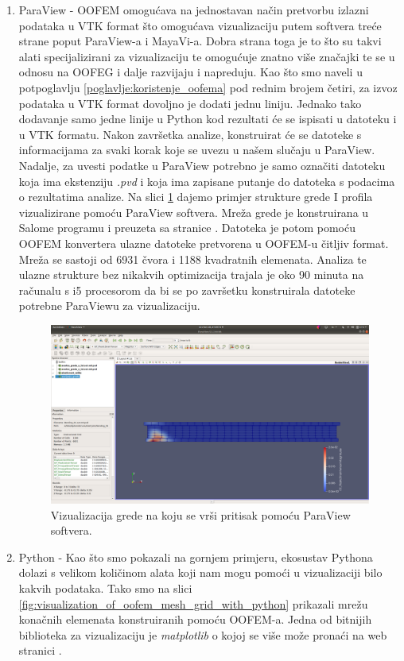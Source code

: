 \documentclass[a4paper,twoside,12pt]{memoir} %
\begin{document}
\begin{enumerate}
    \item ParaView - OOFEM omogućava na jednostavan način pretvorbu izlazni podataka u VTK format što omogućava vizualizaciju putem softvera treće strane poput ParaView-a i MayaVi-a. Dobra strana toga je to što su takvi alati specijalizirani za vizualizaciju te omogućuje znatno više značajki te se u odnosu na OOFEG i dalje razvijaju i napreduju. Kao što smo naveli u potpoglavlju \ref{poglavlje:koristenje_oofema} pod rednim brojem četiri, za izvoz podataka u VTK format dovoljno je dodati jednu liniju. Jednako tako dodavanje samo jedne linije u Python kod rezultati će se ispisati u datoteku i u VTK formatu. Nakon završetka analize, konstruirat će se datoteke s informacijama za svaki korak koje se uvezu u našem slučaju u ParaView. Nadalje, za uvesti podatke u ParaView potrebno je samo označiti datoteku koja ima ekstenziju \textit{.pvd} i koja ima zapisane putanje do datoteka s podacima o rezultatima analize. Na slici \ref{fig:paraview_example} dajemo primjer strukture grede I profila vizualizirane pomoću ParaView softvera. Mreža grede je konstruirana u Salome programu i preuzeta sa stranice \cite{oofem-web}. Datoteka je potom pomoću OOFEM konvertera ulazne datoteke pretvorena u OOFEM-u čitljiv format. Mreža se sastoji od 6931 čvora i 1188 kvadratnih elemenata. Analiza te ulazne strukture bez nikakvih optimizacija trajala je oko 90 minuta na računalu s i5 procesorom da bi se po završetku konstruirala datoteke potrebne ParaViewu za vizualizaciju.
        \begin{figure}[h!t]
        \begin{center}
        \includegraphics[scale=0.2]{pictures/chapter_oofem/paraview_beam_bending_full.png}
        \caption{Vizualizacija grede na koju se vrši pritisak pomoću ParaView softvera.}
        \label{fig:paraview_example}
        \end{center}
        \end{figure}
    \item Python - Kao što smo pokazali na gornjem primjeru, ekosustav Pythona dolazi s velikom količinom alata koji nam mogu pomoći u vizualizaciji bilo kakvih podataka. Tako smo na slici \ref{fig:visualization_of_oofem_mesh_grid_with_python} prikazali mrežu konačnih elemenata konstruiranih pomoću OOFEM-a. Jedna od bitnijih biblioteka za vizualizaciju je \textit{matplotlib} o kojoj se više može pronaći na web stranici \cite{matplotlib_web}.
\end{enumerate}
\end{document}
